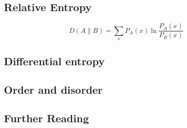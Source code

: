 \documentclass[Lectures.tex]{subfiles}
\begin{document}
\subsection{Relative Entropy}

\[
D(A\|B) =  \sum_x P_{A}(x) \ln \frac{P_A(x)}{P_B(x)}
\]

\subsection{Differential entropy}


\subsection{Order and disorder}


\subsection{Further Reading}
\end{document}
